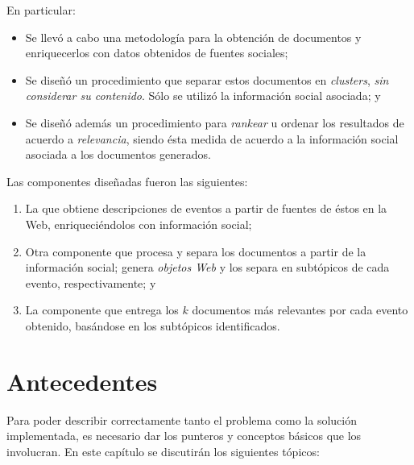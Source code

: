 \documentclass[upright, contnum]{umemoria}
\begin{document}
   En particular:

\begin{itemize}
\item Se llevó a cabo una metodología para la obtención de documentos y
     enriquecerlos con datos obtenidos de fuentes sociales;
\item Se diseñó un procedimiento que separar estos documentos en
     \emph{clusters}, \emph{sin considerar su contenido}. Sólo se utilizó la
     información social asociada; y
\item Se diseñó además un procedimiento para \emph{rankear} u ordenar los
     resultados de acuerdo a \emph{relevancia}, siendo ésta medida de
     acuerdo a la información social asociada a los documentos
     generados.
\end{itemize}
   Las componentes diseñadas fueron las siguientes:

\begin{enumerate}
\item La que obtiene descripciones de eventos a partir de fuentes de
      éstos en la Web, enriqueciéndolos con información social;
\item Otra componente que procesa y separa los documentos a partir de
      la información social; genera \emph{objetos Web} y los separa en
      subtópicos de cada evento, respectivamente; y
\item La componente que entrega los $k$ documentos más relevantes por
      cada evento obtenido, basándose en los subtópicos identificados.
\end{enumerate}
\chapter{Antecedentes}
\label{sec-2}

\label{cap:antecedentes}
  
  Para poder describir correctamente tanto el problema como la
  solución implementada, es necesario dar los punteros y conceptos
  básicos que los involucran. En este capítulo se discutirán los
  siguientes tópicos:
\end{document}
